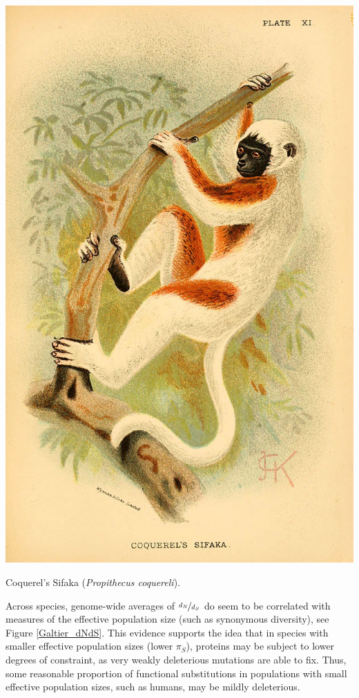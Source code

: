 {\begin{marginfigure}
\begin{center}\includegraphics[width= \textwidth]{illustration_images/Genetic_drift_selection/Coquerels_sifaka/Coquerels_sifaka.jpg}
\end{center}
\caption{Coquerel's Sifaka ({\it Propithecus coquereli}).  } \label{Cuttlefish}
\end{marginfigure}


Across species, genome-wide averages of $\nicefrac{d_N}{d_S}$ do seem to be
correlated with measures of the effective population size (such as
synonymous diversity), see Figure \ref{Galtier_dNdS}. This evidence supports the idea that in species with smaller effective
population sizes (lower $\pi_S$), proteins may be subject to lower degrees of
constraint, as very weakly deleterious mutations are able to fix. Thus,
some reasonable proportion of functional substitutions in populations
with small effective population sizes, such as humans, may be mildly deleterious.



}
